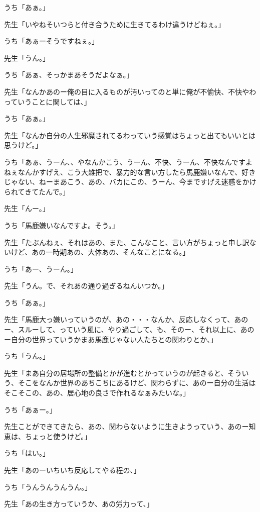 \documentclass[b5j,twoside,twocolumn]{utarticle}
\begin{document}
\begin{description}
\item うち「あぁ。」
\item 先生「いやねそいつらと付き合うために生きてるわけ違うけどねぇ。」
\item うち「あぁーそうですねぇ。」
\item 先生「うん。」
\item うち「あぁ、そっかまあそうだよなぁ。」
\item 先生「なんかあのー俺の目に入るものが汚いってのと単に俺が不愉快、不快やわっていうことに関しては、」
\item うち「あぁ。」
\item 先生「なんか自分の人生邪魔されてるわっていう感覚はちょっと出てもいいとは思うけど。」
\item うち「あぁ、うーん、、やなんかこう、うーん、不快、うーん、不快なんですよねぇなんかすげえ、こう大雑把で、暴力的な言い方したら馬鹿嫌いなんで、好きじゃない、ねーまあこう、あの、バカにこの、うーん、今まですげえ迷惑をかけられてきてたんで。」
\item 先生「んー。」
\item うち「馬鹿嫌いなんですよ。そう。」
\item 先生「たぶんねぇ、それはあの、また、こんなこと、言い方がちょっと申し訳ないけど、あの一時期あの、大体あの、そんなことになる。」
\item うち「あー、うーん。」
\item 先生「うん。で、それあの通り過ぎるねんいつか。」
\item うち「あぁ。」
\item 先生「馬鹿大っ嫌いっていうのが、あの・・・なんか、反応しなくって、あのー、スルーして、っていう風に、やり過ごして、も、そのー、それ以上に、あのー自分の世界っていうかまあ馬鹿じゃない人たちとの関わりとか、」
\item うち「うん。」
\item 先生「まあ自分の居場所の整備とかが進むとかっていうのが起きると、そういう、そこをなんか世界のあちこちにあるけど、関わらずに、あのー自分の生活はそこそこの、あの、居心地の良さで作れるなぁみたいな。」
\item うち「あぁー。」
\item 先生ことができてきたら、あの、関わらないように生きようっていう、あのー知恵は、ちょっと使うけど。」
\item うち「はい。」
\item 先生「あのーいちいち反応してやる程の、」
\item うち「うんうんうんうん。」
\item 先生「あの生き方っていうか、あの労力って、」

\end{description}
\end{document}
